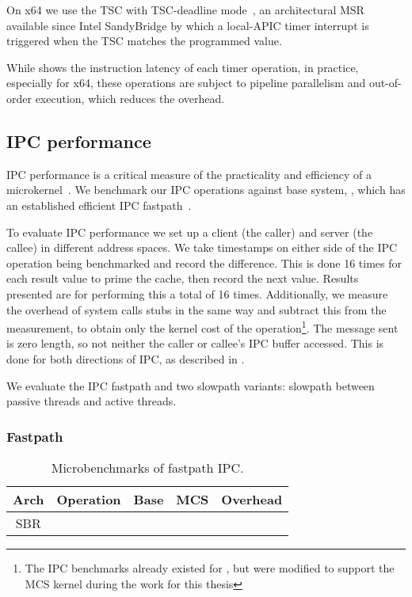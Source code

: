 On x64 we use the \gls{TSC} with \gls{TSC}-deadline mode~\citep{Intel_64_IA-32:asdmspg_325384}, an architectural \gls{MSR} available since
Intel SandyBridge by which a local-APIC timer interrupt is triggered when the \gls{TSC} matches the
programmed value. 

While  shows the instruction latency of each timer operation, in practice, especially
for x64, these operations are subject to pipeline parallelism and out-of-order execution, which
reduces the overhead.

\subsection{IPC performance}

\Gls{IPC} performance is a critical measure of the practicality and efficiency of a
microkernel~\citep{Liedtke_95}. We benchmark our \gls{IPC} operations against base system, \selfour,
which has an established efficient \gls{IPC} fastpath~\citep{Elphinstone_Heiser_13}. 

To evaluate IPC performance we set up a client (the caller) and server (the callee) in different
address spaces. We take
timestamps on either side of the IPC operation being benchmarked and record the difference. This is
done 16 times for each result value to prime the cache, then record the next value. Results
presented are for performing this a total of 16 times. Additionally, we measure the overhead of
system calls stubs in the same way and subtract this from the measurement, to obtain only the kernel
cost of the operation\footnote{The \gls{IPC} benchmarks already existed for \selfour, but were modified to
    support the \gls{MCS} kernel during the work for this thesis}. The message sent is zero length, so not
neither the caller or callee's \gls{IPC} buffer accessed.
This is done for both directions of IPC, as described in . 

We evaluate the \gls{IPC} fastpath and two slowpath variants: slowpath between passive threads and
active threads.

\subsubsection{Fastpath}

\begin{table}[ht]\centering
\begin{tabular}{|c|l| r@{~}l | r@{~}l |r@{~}r|}\hline
\textbf{Arch}           & \multicolumn{1}{c|}{\textbf{Operation}}
                                & \multicolumn{2}{c|}{\textbf{Base}}
                                & \multicolumn{2}{c|}{\textbf{MCS}}
                                & \multicolumn{2}{c|}{\textbf{Overhead}} \\ \hline
\multirow{2}{*}{SBR}

\hline
\multirow{2}{*}{ODX}

\hline
\multirow{2}{*}{x64}

\hline
\end{tabular}
\caption{Microbenchmarks of \selfour fastpath \gls{IPC}.}
\label{t:fastpah-ipc-micro}
\end{table}


